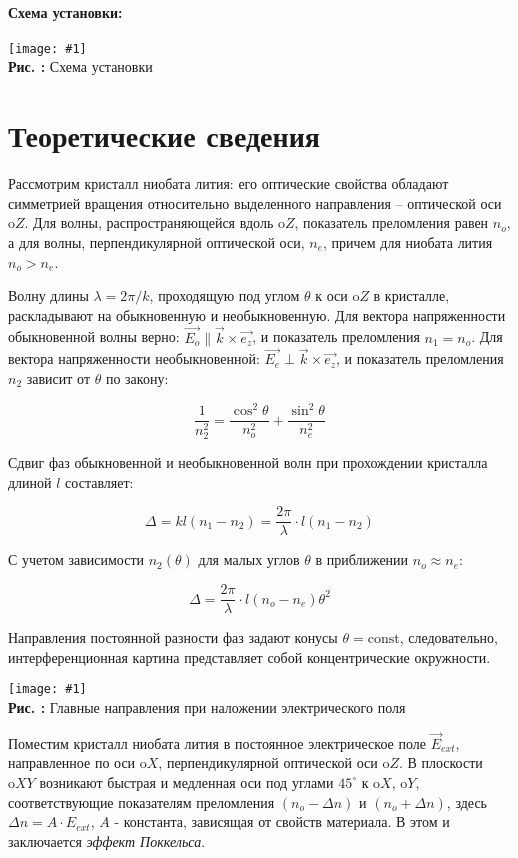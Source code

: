 \documentclass[12pt,a4paper]{article}
\newcounter{picture}
\newcommand{\embed}[3]{\begin{center}
		\texttt{[image: \#1]}
		\\\textbf{Рис. \thepicture:} #3
		\label{pic_\thepicture}
		\addtocounter{picture}{1}
\end{center}}
\begin{document}
	\paragraph*{Схема установки:} \hfill
	
	\embed{PIC_1.png}{0.2}{Схема установки}
	
	\section{Теоретические сведения}
	
	Рассмотрим кристалл ниобата лития: его оптические свойства обладают симметрией вращения относительно выделенного направления -- оптической оси $\mathrm{o}Z$. Для волны, распространяющейся вдоль $\mathrm{o}Z$, показатель преломления равен $n_o$, а для волны, перпендикулярной оптической оси, $n_e$, причем для ниобата лития $n_o > n_e$.
	
	Волну длины $\lambda = 2\pi/k$, проходящую под углом $\theta$ к оси $\mathrm{o}Z$ в кристалле, раскладывают на обыкновенную и необыкновенную. Для вектора напряженности обыкновенной волны верно: $\vec{E_o} \parallel \vec{k} \times \vec{e_z}$, и показатель преломления $n_1 = n_o$. Для вектора напряженности необыкновенной: $\vec{E_e} \perp \vec{k} \times \vec{e_z}$, и показатель преломления $n_2$ зависит от $\theta$ по закону:
	
	$$ \frac{1}{n_2^2} = \frac{\cos^2\theta}{n_o^2} + \frac{\sin^2\theta}{n_e^2} $$
	
	Сдвиг фаз обыкновенной и необыкновенной волн при прохождении кристалла длиной $l$ составляет: 
	
	$$ \Delta = kl(n_1 - n_2) = \frac{2\pi}{\lambda} \cdot l (n_1 - n_2) $$
	
	С учетом зависимости $n_2(\theta)$ для малых углов $\theta$ в приближении $n_o \approx n_e$: 
	
	$$ \Delta = \frac{2\pi}{\lambda}\cdot l (n_o - n_e)\theta^2 $$
	
	Направления постоянной разности фаз задают конусы $\theta = \mathrm{const}$, следовательно, интерференционная картина представляет собой концентрические окружности.
	
	\embed{PIC_2.png}{0.2}{Главные направления при наложении электрического поля}
	
	Поместим кристалл ниобата лития в постоянное электрическое поле $\vec{E}_{ext}$, направленное по оси $\mathrm{o}X$, перпендикулярной оптической оси $\mathrm{o}Z$. В плоскости $\mathrm{o}XY$ возникают быстрая и медленная оси под углами $45^\circ$ к $\mathrm{o}X$, $\mathrm{o}Y$, соответствующие показателям преломления $(n_o - \Delta n)$ и $(n_o + \Delta n)$, здесь $\Delta n = A\cdot E_{ext}$, $A$ - константа, зависящая от свойств материала. В этом и заключается \textit{эффект Поккельса}. 
	
\end{document}
